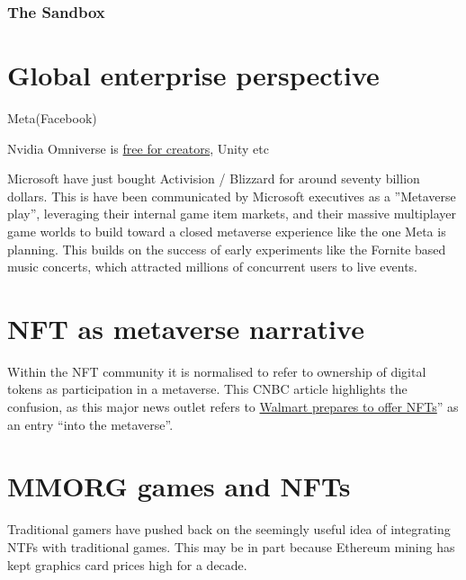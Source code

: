 \subsubsection{The Sandbox}
\lipsum[50]
\section{Global enterprise perspective}
Meta(Facebook)

Nvidia Omniverse is \href{https://www.nvidia.com/en-us/omniverse/creators/}{free for creators}, Unity etc \par

Microsoft have just bought Activision / Blizzard for around seventy billion dollars. This is have been communicated by Microsoft executives as a ''Metaverse play'', leveraging their internal game item markets, and their massive multiplayer game worlds to build toward a closed metaverse experience like the one Meta is planning.
This builds on the success of early experiments like the Fornite based music concerts, which attracted millions of concurrent users to live events.

\section{NFT as metaverse narrative}
Within the NFT community it is normalised to refer to ownership of digital tokens as participation in a metaverse. 
This CNBC article highlights the confusion, as this major news outlet refers to \href{https://www.cnbc.com/2022/01/16/walmart-is-quietly-preparing-to-enter-the-metaverse.html}{Walmart prepares to offer NFTs}'' as an entry ``into the metaverse''.
\lipsum[50]
\section{MMORG games and NFTs}
Traditional gamers have pushed back on the seemingly useful idea of integrating NTFs with traditional games. This may be in part because Ethereum mining has kept graphics card prices high for a decade.

